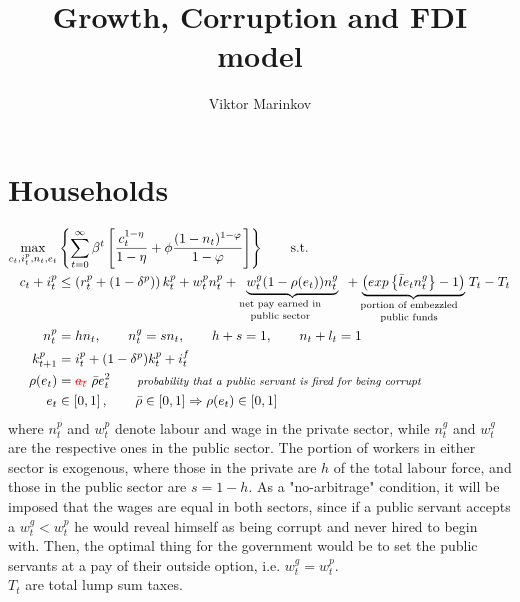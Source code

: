 \documentclass[]{scrartcl}
\title{Growth, Corruption and FDI model}
\author{Viktor Marinkov}
\begin{document}
\maketitle


\section{Households}
\begin{align}
\max_{c_t,i^p_t,n_t,e_t}&\left\lbrace \sum_{t=0}^{\infty}\beta^t\left[ \frac{c_t^{1-\eta}}{1-\eta}+\phi\frac{(1-n_t)^{1-\varphi}}{1-\varphi} \right] \right\rbrace \qquad\text{s.t.}\\
c_t+i^p_t&\leq \left( r^p_t+(1-\delta^p) \right)k^p_t +w^p_t n_t^p+\underbrace{w^g_t (1-\rho(e_t))n^g_t}_{\textrm{\parbox{1.1in}{\shortstack{net pay earned in\\public sector}}}}+\underbrace{\left( exp\left\lbrace \bar{l}e_tn^g_t \right\rbrace-1 \right)}_{\textrm{\parbox{1.1in}{\shortstack{portion of embezzled\\public funds}}}}T_t-T_t\\
n_t^p&= hn_t,\qquad n_t^g=sn_t,\qquad h+s=1, \qquad n_t+l_t=1\\
k^p_{t+1}&=i^p_t+(1-\delta^p)k_t^p +i^f_t\\
\rho(e_t)&=\text{\textcolor{red}{\sout{$ a_t $}}}~\bar{\rho}e_t^2 \qquad \textit{\footnotesize probability that a public servant is fired for being corrupt}\\
e_t&\in\left[ 0,1 \right], \qquad \bar{\rho}\in[0,1]\Rightarrow \rho(e_t)\in[0,1]
\end{align}
where $ n^p_t $ and $ w^p_t $ denote labour and wage in the private sector, while $ n^g_t $ and $ w^g_t  $ are the respective ones in the public sector. The portion of workers in either sector is exogenous, where those in the private are $ h $ of the total labour force, and those in the public sector are $ s=1-h $. As a "no-arbitrage" condition, it will be imposed that the wages are equal in both sectors, since if a public servant accepts a $ w_t^g<w_t^p $ he would reveal himself as being corrupt and never hired to begin with. Then, the optimal thing for the government would be to set the public servants at a pay of their outside option, i.e. $ w_t^g=w_t^p $.\\ $ T_t $ are total lump sum taxes.
\\\\
\end{document}
